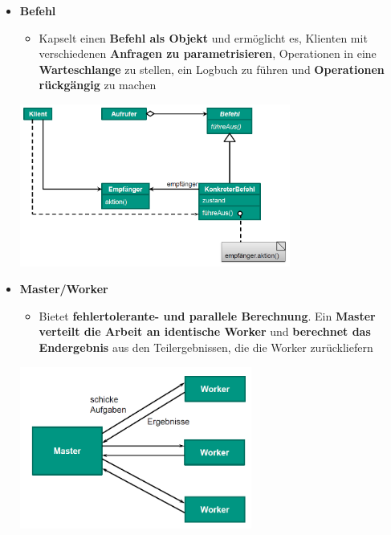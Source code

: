 			\begin{itemize}
				\item \textbf{Befehl}
				\begin{itemize}
					\item Kapselt einen \textbf{Befehl als Objekt} und ermöglicht es, Klienten mit verschiedenen \textbf{Anfragen zu parametrisieren}, Operationen in eine \textbf{Warteschlange} zu stellen, ein Logbuch zu führen und \textbf{Operationen rückgängig} zu machen
				\end{itemize}
				\begin{center}
					\includegraphics[width=0.7\textwidth]{../resources/images/befehl.png}
				\end{center}
				\item \textbf{Master/Worker}
				\begin{itemize}
					\item Bietet \textbf{fehlertolerante- und parallele Berechnung}. Ein \textbf{Master verteilt die Arbeit an identische Worker} und \textbf{berechnet das Endergebnis} aus den Teilergebnissen, die die Worker zurückliefern
				\end{itemize}
				\begin{center}
					\includegraphics[width=0.6\textwidth]{../resources/images/masterWorker.png}
				\end{center}
			\end{itemize}
			
